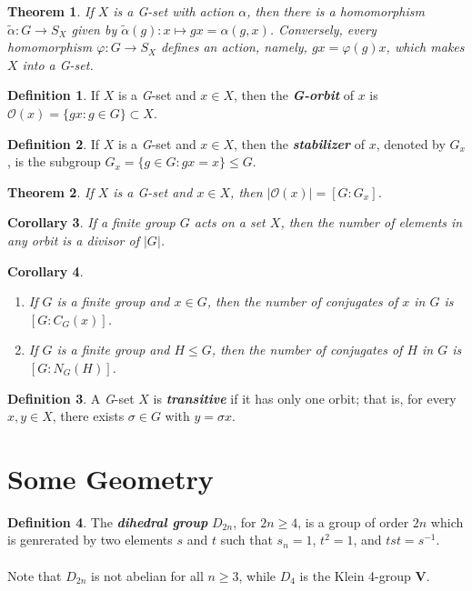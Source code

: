 \documentclass[12pt]{report}
\newtheorem{theorem}{Theorem}[chapter]
\newtheorem{corollary}[theorem]{Corollary}
\theoremstyle{definition}
\newtheorem*{definition}{Definition}
\newcommand{\term}[1]{\textbf{\textit{#1}}}
\begin{document}
\begin{theorem}
	If $X$ is a G-set with action $\alpha$, then there is a homomorphism $\tilde{\alpha}:G\to S_X$ given by $\tilde{\alpha}(g):x\mapsto gx=\alpha(g,x)$. Conversely, every homomorphism $\varphi:G\to S_X$ defines an action, namely, $gx=\varphi(g)x$, which makes $X$ into a G-set.
\end{theorem}

\begin{definition}
	If $X$ is a \textit{G}-set and $x\in X$, then the \term{G-orbit} of $x$ is $\mathcal{O}(x)=\{gx:g\in G\}\subset X$.
\end{definition}

\begin{definition}
	If $X$ is a \textit{G}-set and $x\in X$, then the \term{stabilizer} of $x$, denoted by $G_x$, is the subgroup $G_x=\{g\in G:gx=x\}\leq G$.
\end{definition}

\begin{theorem}
	If $X$ is a \textit{G}-set and $x\in X$, then $|\mathcal{O}(x)|=[G:G_x]$.
\end{theorem}

\begin{corollary}
	If a finite group $G$ acts on a set $X$, then the number of elements in any orbit is a divisor of $|G|$.
\end{corollary}

\begin{corollary}
	\quad
	\begin{enumerate}
		\item If $G$ is a finite group and $x\in G$, then the number of conjugates of $x$ in $G$ is $[G:C_G(x)]$.
		\item If $G$ is a finite group and $H\leq G$, then the number of conjugates of $H$ in $G$ is $[G:N_G(H)]$.
	\end{enumerate}
\end{corollary}

\begin{definition}
	A \textit{G}-set $X$ is \term{transitive} if it has only one orbit; that is, for every $x,y\in X$, there exists $\sigma\in G$ with $y=\sigma x$.
\end{definition}

\section{Some Geometry}
\begin{definition}
	The \term{dihedral group} $D_{2n}$, for $2n\geq 4$, is a group of order $2n$ which is genrerated by two elements $s$ and $t$ such that $s_n=1$, $t^2=1$, and $tst=s^{-1}$.\\
	\\
	Note that $D_{2n}$ is not abelian for all $n\geq 3$, while $D_4$ is the Klein 4-group $\mathbf{V}$.
\end{definition}
\end{document}
